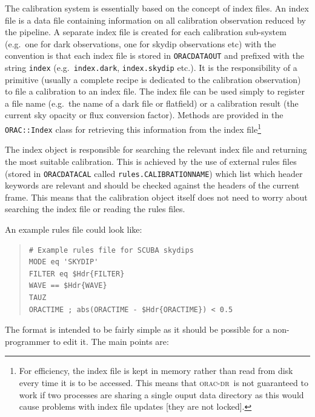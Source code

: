\documentclass[twoside,11pt]{article}
\renewcommand{\_}{\texttt{\symbol{95}}}
\newcommand{\Oracdr}{\textsc{orac-dr}}
\newenvironment{myquote}{\begin{quote}\begin{small}}{\end{small}\end{quote}}
\begin{document}
The calibration system is essentially based on the concept of index
files.  An index file is a data file containing information on all
calibration observation reduced by the pipeline. A separate index file
is created for each calibration sub-system (e.g.\ one for dark
observations, one for skydip observations etc) with the convention is
that each index file is stored in \texttt{ORAC\_DATA\_OUT} and
prefixed with the string \texttt{index} (e.g.\ \texttt{index.dark},
\texttt{index.skydip} etc.). It is the responsibility of a primitive
(usually a complete recipe is dedicated to the calibration
observation) to file a calibration to an index file. The index file
can be used simply to register a file name (e.g.\ the name of a dark file
or flatfield) or a calibration result (the current sky opacity or flux
conversion factor). Methods are provided in the \texttt{ORAC::Index}
class for retrieving this information from the index file\footnote{For
efficiency, the index file is kept in memory rather than read from
disk every time it is to be accessed. This means that \Oracdr\ is not
guaranteed to work if two processes are sharing a single ouput data
directory as this would cause problems with index file updates [they
are not locked].}

The index object is responsible for searching the relevant index
file and returning the most suitable calibration. This is achieved by
the use of external rules files (stored in \texttt{ORAC\_DATA\_CAL}
called \texttt{rules.CALIBRATION\_NAME}) which list which header
keywords are relevant and should be checked against the headers of the
current frame. This means that the calibration object itself does not
need to worry about searching the index file or reading the rules
files. 

An example rules file could look like:
\begin{myquote}
\begin{verbatim}
# Example rules file for SCUBA skydips
MODE eq 'SKYDIP'
FILTER eq $Hdr{FILTER}
WAVE == $Hdr{WAVE}
TAUZ
ORACTIME ; abs(ORACTIME - $Hdr{ORACTIME}) < 0.5
\end{verbatim}
\end{myquote} %

The format is intended to be fairly simple as it should be possible
for a non-programmer to edit it. The main points are:
\end{document}
